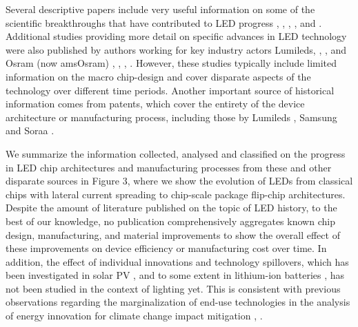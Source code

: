 \documentclass[twoside,twocolumn,9pt]{article}
\begin{document}
Several descriptive papers include very useful information on some of the scientific breakthroughs that have contributed to LED progress \cite{krames2007status}, \cite{Phillips2007}, \cite{Bierhuizen2007}, \cite{Nakamura2013}, \cite{feezell2018invention} and \cite{Taki2019}. Additional  studies providing more detail on specific advances in LED technology were also published by authors working for key industry actors Lumileds\cite{MuellerMach2005}, \cite{Shchekin2006}, \cite{lumi2015lumi}, \cite{Bhardwaj2017} and Osram (now amsOsram) \cite{Haerle2004}, \cite{Baur2009}, \cite{laubsch2009high}, \cite{hahn2014development}. However, these studies typically include limited information on the macro chip-design and cover disparate aspects of the technology over different time periods. Another important source of historical information comes from patents, which cover the entirety of the device architecture or manufacturing process, including those by Lumileds \cite{margalith2011thin}, Samsung \cite{jung2014phos} \cite{cha2019semiconductor} and Soraa \cite{cich2017high}.

We summarize the information collected, analysed and classified on the progress in LED chip architectures and manufacturing processes from these and other disparate sources in Figure 3, where we show the evolution of LEDs from classical chips with lateral current spreading to chip-scale package flip-chip architectures. Despite the amount of literature published on the topic of LED history, to the best of our knowledge, no publication comprehensively aggregates known chip design, manufacturing, and material improvements to show the overall effect of these improvements on device efficiency or manufacturing cost over time. In addition, the effect of individual innovations and technology spillovers, which has been investigated in solar PV \cite{kavlak2018evaluating} \cite{kolesnikov2020novel} \cite{nemet2019solar}, and to some extent in lithium-ion batteries \cite{Stephan2021}, has not been studied in the context of lighting yet. This is consistent with previous observations regarding the marginalization of end-use technologies in the analysis of energy innovation for climate change impact mitigation \cite{Wilson2012}, \cite{Creutzig2018}.
\end{document}
